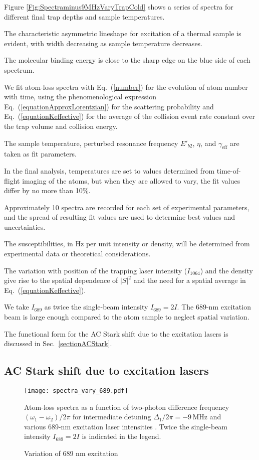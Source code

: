 Figure \ref{Fig:Spectraminus9MHzVaryTrapCold} shows a series of spectra for different final trap depths and sample temperatures.

The characteristic asymmetric lineshape for excitation of a thermal sample is evident, with width decreasing as sample temperature decreases.

The molecular binding energy is close to the sharp edge on the blue side of each spectrum.

We fit atom-loss spectra with Eq.\ (\ref{number}) for the evolution of atom number with time, using the phenomenological expression Eq.\ (\ref{equationApproxLorentzian}) for the scattering probability and Eq.\ (\ref{equationKeffective}) for the average of the collision event rate constant over the trap volume and collision energy.

The sample temperature, perturbed resonance frequency $E'_{b2}$, $\eta$, and $\gamma_{\text{eff}}$ are taken as fit parameters. 

In the final analysis, temperatures are set to values determined from time-of-flight imaging of the atoms, but when they are allowed to vary, the fit values differ by no more than 10\%.

Approximately 10 spectra are recorded for each set of experimental parameters, and the spread of resulting fit values are used to determine best values and uncertainties.


The susceptibilities, in Hz per unit intensity or density, will be determined from experimental data or theoretical considerations.

The variation with position of the trapping laser intensity ($I_{1064}$) and the density give rise to the spatial dependence of $|S|^2$ and the need for a spatial average in Eq.\ (\ref{equationKeffective}).

We take $I_{689}$ as twice the single-beam intensity $I_{689}=2I$. The 689-nm excitation beam is large enough compared to the atom sample to neglect spatial variation.

The functional form for the AC Stark shift due to the excitation lasers is discussed in Sec.\ \ref{sectionACStark}.


\subsection{AC Stark shift due to excitation lasers}

	\begin{figure} 
	\centerline{
	  \texttt{[image: spectra\_vary\_689.pdf]}}
	  \caption{Variation of 689 nm excitation}{Atom-loss spectra as a function of two-photon difference frequency $(\omega_1-\omega_2)/2\pi$ for intermediate detuning $\Delta_1/2\pi=-9$\,MHz and various 689-nm excitation laser intensities . Twice the single-beam intensity $I_{689}=2I$ is indicated in the legend.}
	 \label{Fig:SpectraVarying689Intensity}
	\end{figure}

